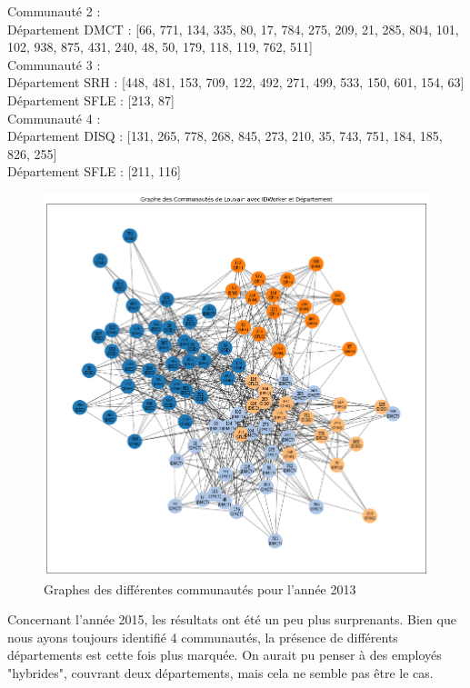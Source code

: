 \documentclass{article}
\begin{document}
Communauté 2 : \\

Département DMCT : [66, 771, 134, 335, 80, 17, 784, 275, 209, 21, 285, 804, 101, 102, 938, 875, 431, 240, 48, 50, 179, 118, 119, 762, 511] \\
Communauté 3 : \\

Département SRH : [448, 481, 153, 709, 122, 492, 271, 499, 533, 150, 601, 154, 63] \\
Département SFLE : [213, 87] \\
Communauté 4 : \\

Département DISQ : [131, 265, 778, 268, 845, 273, 210, 35, 743, 751, 184, 185, 826, 255] \\
Département SFLE : [211, 116] \\

\begin{figure}[h]
    \centering
    \includegraphics[width=16.4cm]{assets/communaute/communaute_2013.png}
    \caption{Graphes des différentes communautés pour l'année 2013}
    \label{fig:communaute_2013}
\end{figure}

Concernant l'année 2015, les résultats ont été un peu plus surprenants. Bien que nous ayons toujours identifié 4 communautés, la présence de différents départements est cette fois plus marquée. On aurait pu penser à des employés "hybrides", couvrant deux départements, mais cela ne semble pas être le cas.
\end{document}
